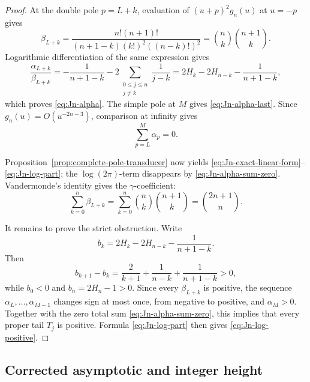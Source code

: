 \documentclass[11pt]{article}
\theoremstyle{definition}
\theoremstyle{remark}
\begin{document}
\begin{proof}
At the double pole \(p=L+k\), evaluation of
\((u+p)^2g_n(u)\) at \(u=-p\) gives
\[
 \beta_{L+k}
 =\frac{n!(n+1)!}
 {(n+1-k)(k!)^2((n-k)!)^2}
 =\binom nk\binom{n+1}{k}.
\]
Logarithmic differentiation of the same expression gives
\[
 \frac{\alpha_{L+k}}{\beta_{L+k}}
 =-\frac1{n+1-k}
  -2\sum_{\substack{0\le j\le n\\j\ne k}}\frac1{j-k}
 =2H_k-2H_{n-k}-\frac1{n+1-k},
\]
which proves \eqref{eq:Jn-alpha}.  The simple pole at \(M\) gives
\eqref{eq:Jn-alpha-last}.  Since \(g_n(u)=O(u^{-2n-3})\), comparison at
infinity gives
\begin{equation}\label{eq:Jn-alpha-sum-zero}
 \sum_{p=L}^{M}\alpha_p=0.
\end{equation}

Proposition~\ref{prop:complete-pole-transducer} now yields
\eqref{eq:Jn-exact-linear-form}--\eqref{eq:Jn-log-part}; the
\(\log(2\pi)\)-term disappears by
\eqref{eq:Jn-alpha-sum-zero}.  Vandermonde's identity gives the
\(\gamma\)-coefficient:
\[
 \sum_{k=0}^n\beta_{L+k}
 =\sum_{k=0}^n\binom nk\binom{n+1}{k}
 =\binom{2n+1}{n}.
\]

It remains to prove the strict obstruction.  Write
\[
 b_k=2H_k-2H_{n-k}-\frac1{n+1-k}.
\]
Then
\[
 b_{k+1}-b_k
 =\frac2{k+1}+\frac1{n-k}+\frac1{n+1-k}>0,
\]
while \(b_0<0\) and \(b_n=2H_n-1>0\).  Since every
\(\beta_{L+k}\) is positive, the sequence
\(\alpha_L,\ldots,\alpha_{M-1}\) changes sign at most once, from negative
to positive, and \(\alpha_M>0\).  Together with the zero total sum
\eqref{eq:Jn-alpha-sum-zero}, this implies that every proper tail \(T_j\)
is positive.  Formula \eqref{eq:Jn-log-part} then gives
\eqref{eq:Jn-log-positive}.
\end{proof}

\subsection{Corrected asymptotic and integer height}
\end{document}
